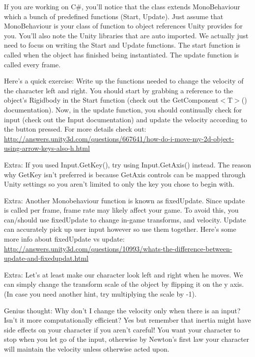 \documentclass[12pt]{article}
\begin{document}
If you are working on C\#, you'll notice that the class extends MonoBehaviour which a bunch of predefined functions (Start, Update). Just assume that MonoBehaviour is your class of function to object references Unity provides for you. You'll also note the Unity libraries that are auto imported. We actually just need to focus on writing the Start and Update functions. The start function is called when the object has finished being instantiated. The update function is called every frame.

\newpage

Here's a quick exercise: Write up the functions needed to change the velocity of the character left and right. You should start by grabbing a reference to the object's Rigidbody in the Start function (check out the GetComponent$<$T$>$() documentation). Now, in the update function, you should continually check for input (check out the Input documentation) and update the velocity according to the button pressed. For more details check out: \url{http://answers.unity3d.com/questions/667641/how-do-i-move-my-2d-object-using-arrow-keys-also-h.html}

Extra: If you used Input.GetKey(), try using Input.GetAxis() instead. The reason why GetKey isn't preferred is because GetAxis controls can be mapped through Unity settings so you aren't limited to only the key you chose to begin with.

Extra: Another Monobehaviour function is known as fixedUpdate. Since update is called per frame, frame rate may likely affect your game. To avoid this, you can/should use fixedUpdate to change in-game transforms, and velocity. Update can accurately pick up user input however so use them together. Here's some more info about fixedUpdate vs update: \url{http://answers.unity3d.com/questions/10993/whats-the-difference-between-update-and-fixedupdat.html}

Extra: Let's at least make our character look left and right when he moves. We can simply change the transform scale of the object by flipping it on the y axis. (In case you need another hint, try multiplying the scale by -1).

Genius thought: Why don't I change the velocity only when there is an input? Isn't it more computationally efficient? Yes but remember that inertia might have side effects on your character if you aren't careful! You want your character to stop when you let go of the input, otherwise by Newton's first law your character will maintain the velocity unless otherwise acted upon.
\end{document}
